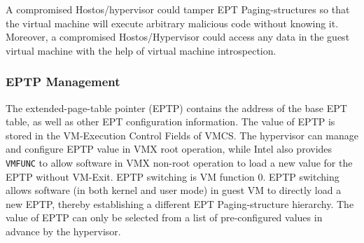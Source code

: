 A compromised Hostos/hypervisor could tamper EPT Paging-structures so that the virtual machine will execute arbitrary malicious code without knowing it. 
Moreover, a compromised Hostos/Hypervisor could access any data in the guest virtual machine with the help of virtual machine introspection.

\subsubsection{EPTP Management}%
\label{ssub:eptp_management}
The extended-page-table pointer (EPTP) contains the address of the base EPT table, as well as other EPT configuration information. 
The value of EPTP is stored in the VM-Execution Control Fields of VMCS. 
The hypervisor can manage and configure EPTP value in VMX root operation, while Intel also provides \verb|VMFUNC| to allow software in VMX non-root operation to load a new value for the EPTP without VM-Exit.
EPTP switching is VM function 0. EPTP switching allows software (in both kernel and user mode) in guest VM to directly load a new EPTP, thereby establishing a different EPT Paging-structure hierarchy. 
The value of EPTP can only be selected from a list of pre-configured values in advance by the hypervisor. 





